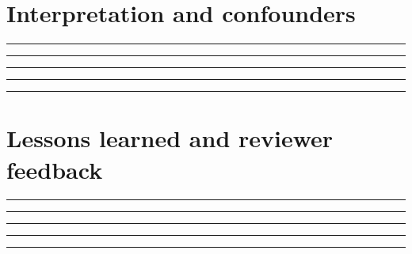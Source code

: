 \documentclass[11pt,letterpaper]{article}
\begin{document}
\section{Interpretation and confounders}
\vspace{2mm}
\noindent\rule{0.93\linewidth}{0.4pt}\par\vspace{13pt}
\noindent\rule{0.93\linewidth}{0.4pt}\par\vspace{13pt}
\noindent\rule{0.93\linewidth}{0.4pt}\par\vspace{13pt}
\noindent\rule{0.93\linewidth}{0.4pt}\par\vspace{13pt}
\noindent\rule{0.93\linewidth}{0.4pt}\par\vspace{13pt}
\section{Lessons learned and reviewer feedback}
\vspace{2mm}
\noindent\rule{0.93\linewidth}{0.4pt}\par\vspace{13pt}
\noindent\rule{0.93\linewidth}{0.4pt}\par\vspace{13pt}
\noindent\rule{0.93\linewidth}{0.4pt}\par\vspace{13pt}
\noindent\rule{0.93\linewidth}{0.4pt}\par\vspace{13pt}
\noindent\rule{0.93\linewidth}{0.4pt}\par\vspace{13pt}
\end{document}
